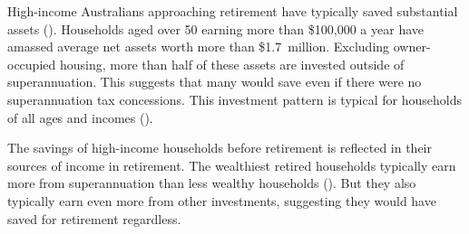 High-income Australians approaching retirement have typically saved substantial assets (). Households aged over 50 earning more than \$100,000 a year have amassed average net assets worth more than \$1.7~million. Excluding owner-occupied housing, more than half of these assets are invested outside of superannuation. This suggests that many would save even if there were no superannuation tax concessions. This investment pattern is typical for households of all ages and incomes ().

The savings of high-income households before retirement is reflected in their sources of income in retirement. The wealthiest retired households typically earn more from superannuation than less wealthy households (). But they also typically earn even more from other investments, suggesting they would have saved for retirement regardless.




